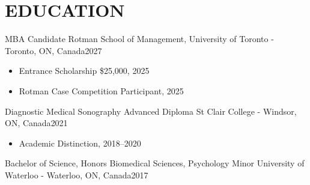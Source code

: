 
\section{\textcolor{airforceblue}{EDUCATION}}
  \employmentSubheadingListStart
    \employmentSubheading
      {MBA Candidate}{}
      {Rotman School of Management, University of Toronto - Toronto, ON, Canada}{2027}
      \begin{itemize}[leftmargin=1.5em]
        \item Entrance Scholarship \$25,000, 2025
        \item Rotman Case Competition Participant, 2025
      \end{itemize}
    \employmentSubheading
      {Diagnostic Medical Sonography Advanced Diploma}{}
      {St Clair College - Windsor, ON, Canada}{2021}
      \begin{itemize}[leftmargin=1.5em]
        \item Academic Distinction, 2018--2020
      \end{itemize}
    \employmentSubheading
      {Bachelor of Science, Honors Biomedical Sciences, Psychology Minor}{}
      {University of Waterloo - Waterloo, ON, Canada}{2017}
  \employmentSubheadingListEnd
  \vspace{-10pt}
